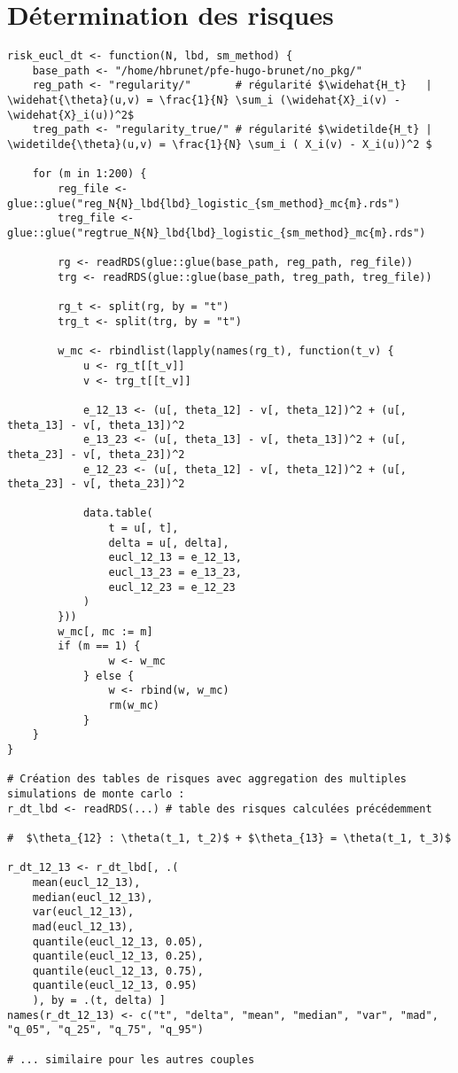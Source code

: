 \section{Détermination des risques}

\begin{verbatim}
risk_eucl_dt <- function(N, lbd, sm_method) {
    base_path <- "/home/hbrunet/pfe-hugo-brunet/no_pkg/"
    reg_path <- "regularity/"       # régularité $\widehat{H_t}   | \widehat{\theta}(u,v) = \frac{1}{N} \sum_i (\widehat{X}_i(v) - \widehat{X}_i(u))^2$
    treg_path <- "regularity_true/" # régularité $\widetilde{H_t} | \widetilde{\theta}(u,v) = \frac{1}{N} \sum_i ( X_i(v) - X_i(u))^2 $

    for (m in 1:200) {
        reg_file <- glue::glue("reg_N{N}_lbd{lbd}_logistic_{sm_method}_mc{m}.rds")
        treg_file <- glue::glue("regtrue_N{N}_lbd{lbd}_logistic_{sm_method}_mc{m}.rds")

        rg <- readRDS(glue::glue(base_path, reg_path, reg_file))
        trg <- readRDS(glue::glue(base_path, treg_path, treg_file))

        rg_t <- split(rg, by = "t")
        trg_t <- split(trg, by = "t")

        w_mc <- rbindlist(lapply(names(rg_t), function(t_v) {
            u <- rg_t[[t_v]]
            v <- trg_t[[t_v]]

            e_12_13 <- (u[, theta_12] - v[, theta_12])^2 + (u[, theta_13] - v[, theta_13])^2
            e_13_23 <- (u[, theta_13] - v[, theta_13])^2 + (u[, theta_23] - v[, theta_23])^2
            e_12_23 <- (u[, theta_12] - v[, theta_12])^2 + (u[, theta_23] - v[, theta_23])^2

            data.table(
                t = u[, t],
                delta = u[, delta],
                eucl_12_13 = e_12_13,
                eucl_13_23 = e_13_23,
                eucl_12_23 = e_12_23
            )
        }))
        w_mc[, mc := m]
        if (m == 1) {
                w <- w_mc
            } else {
                w <- rbind(w, w_mc)
                rm(w_mc)
            }
    }
}

# Création des tables de risques avec aggregation des multiples simulations de monte carlo :
r_dt_lbd <- readRDS(...) # table des risques calculées précédemment

#  $\theta_{12} : \theta(t_1, t_2)$ + $\theta_{13} = \theta(t_1, t_3)$

r_dt_12_13 <- r_dt_lbd[, .(
    mean(eucl_12_13), 
    median(eucl_12_13), 
    var(eucl_12_13), 
    mad(eucl_12_13), 
    quantile(eucl_12_13, 0.05), 
    quantile(eucl_12_13, 0.25), 
    quantile(eucl_12_13, 0.75), 
    quantile(eucl_12_13, 0.95)
    ), by = .(t, delta) ]
names(r_dt_12_13) <- c("t", "delta", "mean", "median", "var", "mad", "q_05", "q_25", "q_75", "q_95")

# ... similaire pour les autres couples
\end{verbatim}

